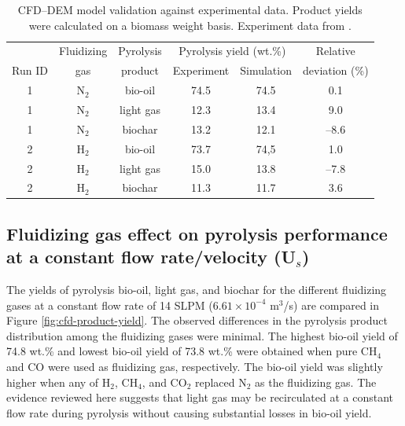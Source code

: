\begin{table}[H]
    \centering
    \caption{CFD–DEM model validation against experimental data. Product yields were calculated on a biomass weight basis. Experiment data from \cite{French-2021}.}
    \label{tab:cfddem-validation}
    \begin{tabular}{cccccc}
        \toprule
               & Fluidizing   & Pyrolysis & \multicolumn{2}{c}{Pyrolysis yield (wt.\%)} & Relative \\
        Run ID & gas          & product   & Experiment & Simulation                     & deviation (\%) \\
        \midrule
        1 & N$_2$ & bio-oil   & 74.5      & 74.5       & 0.1     \\
        1 & N$_2$ & light gas & 12.3      & 13.4       & 9.0     \\
        1 & N$_2$ & biochar   & 13.2      & 12.1       & --8.6   \\
        2 & H$_2$ & bio-oil   & 73.7      & 74,5       & 1.0     \\
        2 & H$_2$ & light gas & 15.0      & 13.8       & --7.8   \\
        2 & H$_2$ & biochar   & 11.3      & 11.7       & 3.6     \\
        \bottomrule
    \end{tabular}
\end{table}

\subsection{Fluidizing gas effect on pyrolysis performance at a constant flow rate/velocity (U\texorpdfstring{$_s$}{s})}

The yields of pyrolysis bio-oil, light gas, and biochar for the different fluidizing gases at a constant flow rate of 14 SLPM ($6.61\times10^{-4}$ m$^3$/s) are compared in Figure \ref{fig:cfd-product-yield}. The observed differences in the pyrolysis product distribution among the fluidizing gases were minimal. The highest bio-oil yield of 74.8 wt.\% and lowest bio-oil yield of 73.8 wt.\% were obtained when pure CH$_4$ and CO were used as fluidizing gas, respectively. The bio-oil yield was slightly higher when any of H$_2$, CH$_4$, and CO$_2$ replaced N$_2$ as the fluidizing gas. The evidence reviewed here suggests that light gas may be recirculated at a constant flow rate during pyrolysis without causing substantial losses in bio-oil yield.

